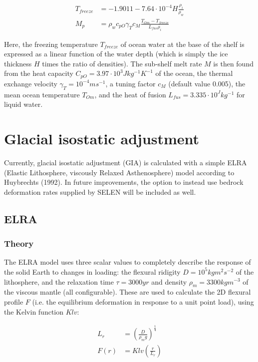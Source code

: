 \documentclass{article}
\begin{document}
\begin{align}
T_{freeze} &= -1.9011 - 7.64 \cdot 10^{-4} H \frac{\rho_i}{\rho_w} \\
M_p &= \rho_w c_{pO} \gamma_T c_M \frac{T_{Om} - T_{freeze}}{L_{fus} \rho_i}
\end{align}

Here, the freezing temperature $T_{freeze}$ of ocean water at the base of the shelf is expressed as a linear function of the water depth (which is simply the ice thickness $H$ times the ratio of densities). The sub-shelf melt rate $M$ is then found from the heat capacity $C_{pO} = 3.97 \cdot 10^3 J kg^{-1} K^{-1} $ of the ocean, the thermal exchange velocity $\gamma_T = 10^{-4} m s^{-1}$, a tuning factor $c_M$ (default value 0.005), the mean ocean temperature $T_{Om}$, and the heat of fusion $L_{fus} = 3.335 \cdot 10^ J kg^{-1}$ for liquid water.\\

\newpage
\section{Glacial isostatic adjustment}

Currently, glacial isostatic adjustment (GIA) is calculated with a simple ELRA (Elastic Lithosphere, viscously Relaxed Asthenosphere) model according to Huybrechts (1992). In future improvements, the option to instead use bedrock deformation rates supplied by SELEN will be included as well.

\subsection{ELRA}

\subsubsection{Theory}

The ELRA model uses three scalar values to completely describe the response of the solid Earth to changes in loading: the flexural ridigity $D = 10^5 kg m^2 s^{-2}$ of the lithosphere, and the relaxation time $\tau = 3000 yr$ and density $\rho_m = 3300 kg m^{-3}$ of the viscous mantle (all configurable). These are used to calculate the 2D flexural profile $F$ (i.e. the equilibrium deformation in response to a unit point load), using the Kelvin function $Klv$:

\begin{align}
L_r &= {\left( \frac{D}{\rho_m g} \right) }^{\frac{1}{4}} \\
F(r) &= Klv( \frac{r}{L_r} )
\end{align}
\end{document}

